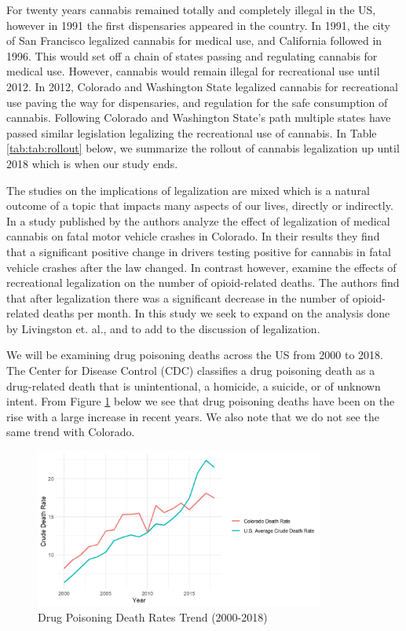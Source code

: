 \documentclass{article}
\begin{document}
For twenty years cannabis remained totally and completely illegal in the US, however in 1991 the first dispensaries appeared in the country. In 1991, the city of San Francisco legalized cannabis for medical use, and California followed in 1996. This would set off a chain of states passing and regulating cannabis for medical use. However, cannabis would remain illegal for recreational use until 2012. In 2012, Colorado and Washington State legalized cannabis for recreational use paving the way for dispensaries, and regulation for the safe consumption of cannabis. Following Colorado and Washington State’s path multiple states have passed similar legislation legalizing the recreational use of cannabis. In Table \ref{tab:tab:rollout} below, we summarize the rollout of cannabis legalization up until 2018 which is when our study ends.



The studies on the implications of legalization are mixed which is a natural outcome of a topic that impacts many aspects of our lives, directly or indirectly. In a study published by \citet{Salomonsen-SautelStacy2014Tifm} the authors analyze the effect of legalization of medical cannabis on fatal motor vehicle crashes in Colorado. In their results they find that a significant positive change in drivers testing positive for cannabis in fatal vehicle crashes after the law changed. In contrast however, \citet{LivingstonMelvinD2017RCLa} examine the effects of recreational legalization on the number of opioid-related deaths. The authors find that after legalization there was a significant decrease in the number of opioid-related deaths per month. In this study we seek to expand on the analysis done by Livingston et. al., and to add to the discussion of legalization.

We will be examining drug poisoning deaths across the US from 2000 to 2018. The Center for Disease Control (CDC) classifies a drug poisoning death as a drug-related death that is unintentional, a homicide, a suicide, or of unknown intent. From Figure \ref{fig:death_rates_trend} below we see that drug poisoning deaths have been on the rise with a large increase in recent years. We also note that we do not see the same trend with Colorado.

\begin{figure}[H]
	\begin{center}
		\includegraphics[width=0.85\textwidth]{death_rates_trend}
	\end{center}
	\caption{Drug Poisoning Death Rates Trend (2000-2018)}
	\label{fig:death_rates_trend}
\end{figure}
\end{document}
